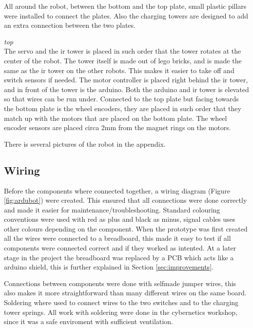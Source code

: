 All around the robot, between the bottom and the top plate, small plastic pillars were installed to connect the plates. Also the charging towers are designed to add an extra connection between the two plates.

\textit{top}
\\
The servo and the \acrshort{ir} tower is placed in such order that the tower rotates at the center of the robot. The tower itself is made out of lego bricks, and is made the same as the \acrshort{ir} tower on the other robots. This makes it easier to take off and switch sensors if needed. The motor controller is placed right behind the \acrshort{ir} tower, and in front of the tower is the arduino. Both the arduino and \acrshort{ir} tower is elevated so that wires can be run under. Connected to the top plate but facing towards the bottom plate is the wheel encoders, they are placed in such order that they match up with the motors that are placed on the bottom plate. The wheel encoder sensors are placed circa 2mm from the magnet rings on the motors.

There is several pictures of the robot in the appendix.

\subsection{Wiring}
Before the components where connected together, a wiring diagram (Figure \ref{fig:ardubot}) were created. This ensured that all connections were done correctly and made it easier for maintenance/troubleshooting. Standard colouring conventions were used with red as plus and black as minus, signal cables uses other colours depending on the component. When the prototype was first created all the wires were connected to a breadboard, this made it easy to test if all components were connected correct and if they worked as intented. At a later stage in the project the breadboard was replaced by a PCB which acts like a arduino shield, this is further explained in Section \ref{sec:improvements}.

Connections between components were done with selfmade jumper wires, this also makes it more straightforward than many different wires on the same board. Soldering where used to connect wires to the two switches and to the charging tower springs. All work with soldering were done in the cybernetics workshop, since it was a safe enviroment with sufficient ventilation.